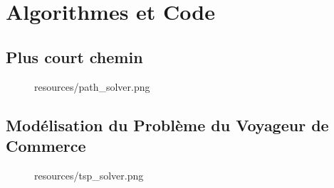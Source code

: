 \appendix
{}
\renewcommand{\thepage}{\Roman{page}}

\chapter{Algorithmes et Code}
\section{Plus court chemin}
\label{app:shortest_path_code}

\begin{figure}[H]
    \centering
    \begin{includegraphics}[width=1\textwidth]{resources/path_solver.png}
    \end{includegraphics}
\end{figure}

\section{Modélisation du Problème du Voyageur de Commerce}
\label{app:tsp_model}

\begin{figure}[H]
    \centering
    \begin{includegraphics}[width=1\textwidth]{resources/tsp_solver.png}
    \end{includegraphics}
    
\end{figure}
